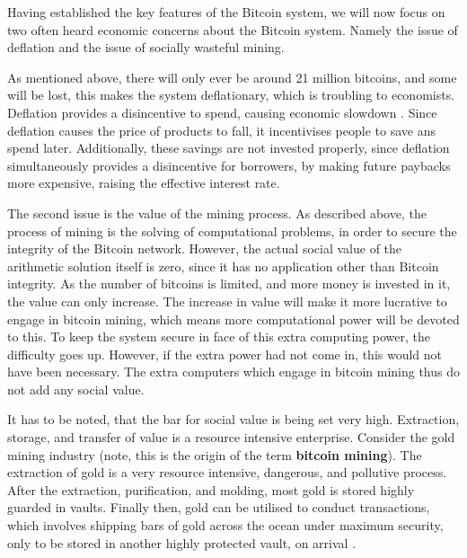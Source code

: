 \documentclass[12pt]{article}\usepackage[]{graphicx}\usepackage[]{color}
\begin{document}
Having established the key features of the Bitcoin system,
we will now focus on two often heard economic concerns about the Bitcoin system.
Namely the issue of deflation and the issue of socially wasteful mining.

As mentioned above, there will only ever be around 21 million bitcoins, and some will be lost,
this makes the system deflationary, which is troubling to economists.
Deflation provides a disincentive to spend, causing economic slowdown \parencite[see e.g.][]{fisher1933debt}. 
Since deflation causes the price of products to fall, it incentivises people to save ans spend later.
Additionally, these savings are not invested properly,
since deflation simultaneously provides a disincentive for borrowers, 
by making future paybacks more expensive, raising the effective interest rate.

The second issue is the value of the mining process.
As described above, the process of mining is the solving of computational problems,
in order to secure the integrity of the Bitcoin network.
However, the actual social value of the arithmetic solution itself is zero, since it has no application other than Bitcoin integrity.
As the number of bitcoins is limited, and more money is invested in it, the value can only increase.
The increase in value will make it more lucrative to engage in bitcoin mining,
which means more computational power will be devoted to this.
To keep the system secure in face of this extra computing power, the difficulty goes up.
However, if the extra power had not come in, this would not have been necessary.
The extra computers which engage in bitcoin mining thus do not add any social value.

It has to be noted, that the bar for social value is being set very high.
Extraction, storage, and transfer of value is a resource intensive enterprise.
Consider the gold mining industry (note, this is the origin of the term \textbf{bitcoin mining}).
The extraction of gold is a very resource intensive, dangerous, and pollutive process.
After the extraction, purification, and molding, most gold is stored highly guarded in vaults.
Finally then, gold can be utilised to conduct transactions,
which involves shipping bars of gold across the ocean under maximum security,
only to be stored in another highly protected vault, on arrival \parencite[see e.g.][]{friedman1967monetary}.
\end{document}
